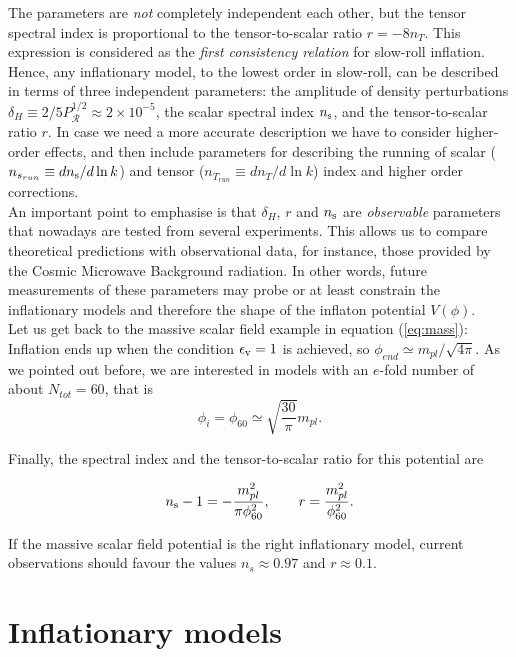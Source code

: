 \documentclass{rmaa}
\def\beq{\begin{equation}}
\def\eeq{\end{equation}}
\def\cal{\mathcal}
\begin{document}
\noindent
The parameters are {\em not} completely independent each other,  but the tensor spectral 
index is proportional to the tensor-to-scalar ratio
$r = -8 n_{T}  $.  This expression is considered as the \textit{first consistency
relation} for slow-roll inflation.  
Hence, any inflationary model, to the lowest order in slow-roll, 
can be described in terms of three independent parameters:
 the amplitude of density perturbations
 $\delta_H\equiv 2/5P_\cal R^{1/2} \approx 2 \times 10^{-5}$, the scalar spectral index $n_{\rm s}$,
and the tensor-to-scalar ratio $r$.
In case we need a more accurate description we have to consider higher-order effects, 
and then include parameters for describing the running of scalar ($n_{s_{run}} \equiv d n_{\rm s} / d\ln{k}$)
and tensor ($n_{T_{run}} \equiv  d n_T / d\ln{k}$) index and higher order corrections. 
\\

An important point to emphasise is that  $\delta_H$, $r$ and $n_{\rm s}$ are {\em observable} 
parameters that nowadays are tested from several experiments. 
This allows us to compare theoretical predictions with observational data,  
for instance, those provided by the Cosmic Microwave Background radiation. 
In other words, future measurements of these parameters may
probe or at least constrain the inflationary models and therefore the shape of the inflaton potential $V(\phi)$.
\\

Let us get back to the massive scalar field example in equation  (\ref{eq:mass}):
%
Inflation ends up when the condition $\epsilon_{\rm v}=1$ is achieved, so $\phi_{end}\simeq m_{pl}/\sqrt{4 \pi}$.
 As we pointed out before, we are interested in models with an $e$-fold number of about $N_{tot}=60$, that is
 \beq
 \phi_i=\phi_{60}\simeq \sqrt{\frac{30}{\pi}}m_{pl}.
 \eeq
 
 \noindent
 Finally, the spectral index and the tensor-to-scalar ratio for this potential are
 
 \beq
 n_{\rm s}-1= -\frac{m_{pl}^2}{\pi \phi_{60}^2}, \qquad r= \frac{m_{pl}^2}{\phi_{60}^2}.
 \eeq

\noindent
If the massive scalar field potential is the right inflationary model, current observations should favour
the values $n_s\approx 0.97$ and $r\approx 0.1$.
\\



\section{Inflationary models}
\end{document}

